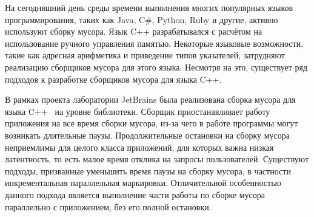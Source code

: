 На сегодняшний день среды времени выполнения многих популярных языков программирования, 
таких как Java, C\#, Python, Ruby и другие, активно используют сборку мусора. 
Язык C++ разрабатывался с расчётом на использование ручного управления памятью. 
Некоторые языковые возможности, такие как адресная арифметика и приведение типов указателей, 
затрудняют реализацию сборщиков мусора для этого языка. 
Несмотря на это, существует ряд подходов к разработке сборщиков мусора для языка C++. 

В рамках проекта лаборатории JetBrains была реализована сборка мусора для языка 
C++~\cite{book:precisegc_berezun,book:precisegc_samofalov,book:precisegc_secr} на уровне 
библиотеки. 
Сборщик приостанавливает работу приложения на все время сборки мусора, из-за чего в работе 
программы могут возникать длительные паузы. 
Продолжительные остановки на сборку мусора неприемлимы для целого класса приложений, 
для которых важна низкая латентность, то есть малое время отклика на запросы пользователей. 
Существуют подходы, призванные уменьшить время паузы на сборку мусора, в частности 
инкрементальная параллельная маркировки. 
Отличительной особенностью данного подхода является выполнение части работы по сборке мусора 
параллельно с приложением, без его полной остановки.